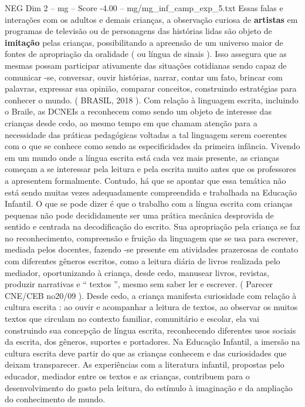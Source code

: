 \begin{textsample}{NEG Dim 2 – mg – Score -4.00 – mg/mg\_inf\_camp\_exp\_5.txt}
Essas falas e interações com os adultos e demais crianças, a observação curiosa de \textbf{artistas} em programas de televisão ou de personagens das histórias lidas são objeto de \textbf{imitação} pelas crianças, possibilitando a apreensão de um universo maior de fontes de apropriação da oralidade ( ou língua de sinais ).
Isso assegura que as mesmas possam participar ativamente das situações cotidianas sendo capaz de comunicar -se, conversar, ouvir histórias, narrar, contar um fato, brincar com palavras, expressar sua opinião, comparar conceitos, construindo estratégias para conhecer o mundo. ( BRASIL, 2018 ).
Com relação à linguagem escrita, incluindo o Braile, as DCNEIs a reconhecem como sendo um objeto de interesse das crianças desde cedo, ao mesmo tempo em que chamam atenção para a necessidade das práticas pedagógicas voltadas a tal linguagem serem coerentes com o que se conhece como sendo as especificidades da primeira infância.
Vivendo em um mundo onde a língua escrita está cada vez mais presente, as crianças começam a se interessar pela leitura e pela escrita muito antes que os professores a apresentem formalmente.
Contudo, há que se apontar que essa temática não está sendo muitas vezes adequadamente compreendida e trabalhada na Educação Infantil.
O que se pode dizer é que o trabalho com a língua escrita com crianças pequenas não pode decididamente ser uma prática mecânica desprovida de sentido e centrada na decodificação do escrito.
Sua apropriação pela criança se faz no reconhecimento, compreensão e fruição da linguagem que se usa para escrever, mediada pelos docentes, fazendo -se presente em atividades prazerosas de contato com diferentes gêneros escritos, como a leitura diária de livros realizada pelo mediador, oportunizando à criança, desde cedo, manusear livros, revistas, produzir narrativas e “ textos ”, mesmo sem saber ler e escrever. ( Parecer CNE/CEB no20/09 ).
Desde cedo, a criança manifesta curiosidade com relação à cultura escrita : ao ouvir e acompanhar a leitura de textos, ao observar os muitos textos que circulam no contexto familiar, comunitário e escolar, ela vai construindo sua concepção de língua escrita, reconhecendo diferentes usos sociais da escrita, dos gêneros, suportes e portadores.
Na Educação Infantil, a imersão na cultura escrita deve partir do que as crianças conhecem e das curiosidades que deixam transparecer.
As experiências com a literatura infantil, propostas pelo educador, mediador entre os textos e as crianças, contribuem para o desenvolvimento do gosto pela leitura, do estímulo à imaginação e da ampliação do conhecimento de mundo.

\end{textsample}
